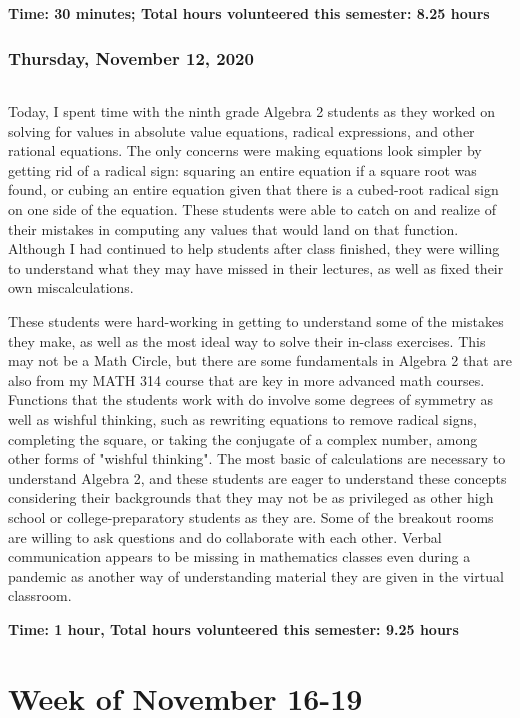 \documentclass{article}
\begin{document}
\textbf{Time: 30 minutes; Total hours volunteered this semester: 8.25 hours}


\section{Thursday, November 12, 2020}

\paragraph{}Today, I spent time with the ninth grade Algebra 2 students as they worked on solving for values in absolute value equations, radical expressions, and other rational equations. The only concerns were making equations look simpler by getting rid of a radical sign: squaring an entire equation if a square root was found, or cubing an entire equation given that there is a cubed-root radical sign on one side of the equation. These students were able to catch on and realize of their mistakes in computing any values that would land on that function. Although I had continued to help students after class finished, they were willing to understand what they may have missed in their lectures, as well as fixed their own miscalculations. 

These students were hard-working in getting to understand some of the mistakes they make, as well as the most ideal way to solve their in-class exercises. This may not be a Math Circle, but there are some fundamentals in Algebra 2 that are also from my MATH 314 course that are key in more advanced math courses. Functions that the students work with do involve some degrees of symmetry as well as wishful thinking, such as rewriting equations to remove radical signs, completing the square, or taking the conjugate of a complex number, among other forms of "wishful thinking". The most basic of calculations are necessary to understand Algebra 2, and these students are eager to understand these concepts considering their backgrounds that they may not be as privileged as other high school or college-preparatory students as they are. Some of the breakout rooms are willing to ask questions and do collaborate with each other. Verbal communication appears to be missing in mathematics classes even during a pandemic as another way of understanding material they are given in the virtual classroom. 

\textbf{Time: 1 hour, Total hours volunteered this semester: 9.25 hours}

\part{Week of November 16-19}
\end{document}
